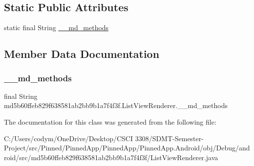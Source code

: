 \subsection*{Static Public Attributes}
\begin{DoxyCompactItemize}
\item 
static final String \hyperlink{classmd5b60ffeb829f638581ab2bb9b1a7f4f3f_1_1_list_view_renderer_ad5546d58609fec476ca441ccf586e954}{\+\_\+\+\_\+md\+\_\+methods}
\end{DoxyCompactItemize}


\subsection{Member Data Documentation}
\mbox{\label{classmd5b60ffeb829f638581ab2bb9b1a7f4f3f_1_1_list_view_renderer_ad5546d58609fec476ca441ccf586e954}} 
\subsubsection{\texorpdfstring{\+\_\+\+\_\+md\+\_\+methods}{\_\_md\_methods}}
{\footnotesize\ttfamily final String md5b60ffeb829f638581ab2bb9b1a7f4f3f.\+List\+View\+Renderer.\+\_\+\+\_\+md\+\_\+methods\hspace{0.3cm}{\ttfamily [static]}}



The documentation for this class was generated from the following file\+:\begin{DoxyCompactItemize}
\item 
C\+:/\+Users/codym/\+One\+Drive/\+Desktop/\+C\+S\+C\+I 3308/\+S\+D\+M\+T-\/\+Semester-\/\+Project/src/\+Pinned/\+Pinned\+App/\+Pinned\+App/\+Pinned\+App.\+Android/obj/\+Debug/android/src/md5b60ffeb829f638581ab2bb9b1a7f4f3f/List\+View\+Renderer.\+java\end{DoxyCompactItemize}
